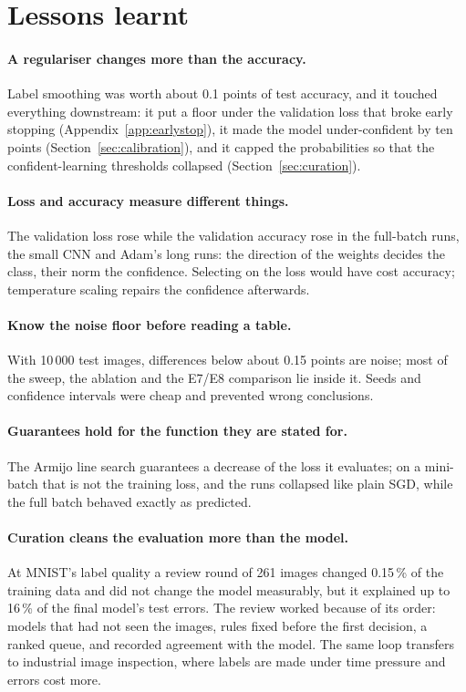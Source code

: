 \documentclass[11pt,a4paper]{article}
\newcommand{\1}{\mathbf{1}}
\begin{document}
\FloatBarrier
\section{Lessons learnt}
\label{sec:lessons}

\paragraph{A regulariser changes more than the accuracy.} Label smoothing was worth about 0.1
points of test accuracy, and it touched everything downstream: it put a floor under the
validation loss that broke early stopping (Appendix~\ref{app:earlystop}), it made the model
under-confident by ten points (Section~\ref{sec:calibration}), and it capped the probabilities
so that the confident-learning thresholds collapsed (Section~\ref{sec:curation}).

\paragraph{Loss and accuracy measure different things.} The validation loss rose while the
validation accuracy rose in the full-batch runs, the small CNN and Adam's long runs: the
direction of the weights decides the class, their norm the confidence. Selecting on the loss
would have cost accuracy; temperature scaling repairs the confidence afterwards.

\paragraph{Know the noise floor before reading a table.} With 10\,000 test images, differences
below about 0.15 points are noise; most of the sweep, the ablation and the E7/E8 comparison
lie inside it. Seeds and confidence intervals were cheap and prevented wrong conclusions.

\paragraph{Guarantees hold for the function they are stated for.} The Armijo line search
guarantees a decrease of the loss it evaluates; on a mini-batch that is not the training loss,
and the runs collapsed like plain SGD, while the full batch behaved exactly as predicted.

\paragraph{Curation cleans the evaluation more than the model.} At MNIST's label quality a
review round of 261 images changed 0.15\,\% of the training data and did not change the model
measurably, but it explained up to 16\,\% of the final model's test errors. The review worked
because of its order: models that had not seen the images, rules fixed before the first
decision, a ranked queue, and recorded agreement with the model. The same loop transfers to
industrial image inspection, where labels are made under time pressure and errors cost more.
\end{document}
